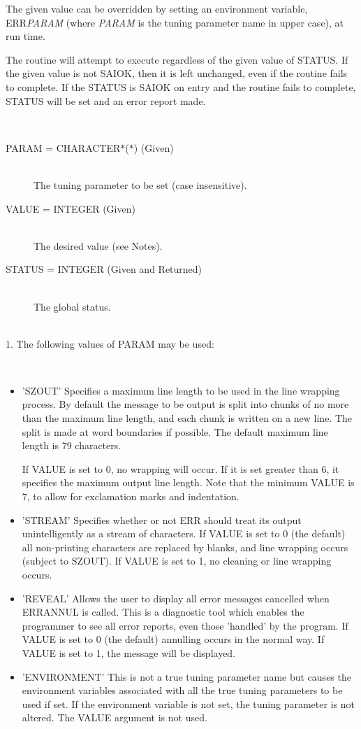 \documentclass[twoside,11pt]{article}
\renewcommand{\_}{\texttt{\symbol{95}}}
\newcommand{\sstinvocation}[1]{\item[Invocation:]\hspace{0.4em}{\tt #1}}
\newcommand{\sstarguments}[1]{
   \item[Arguments:] \mbox{} \\
   \vspace{-3.5ex}
   \begin{description}
      #1
   \end{description}
}
\newcommand{\sstsubsection}[1]{ \item[{#1}] \mbox{} \\}
\newcommand{\sstnotes}[1]{\item[Notes:] \mbox{} \\[1.3ex] #1}
\newcommand{\sstitemlist}[1]{
  \mbox{} \\
  \vspace{-3.5ex}
  \begin{itemize}
     #1
  \end{itemize}
}
\newcommand{\sstitem}{\item}
\newcommand{\sstinvocation}[1]{\item[Invocation:]
      \begin{description}
         {\ssttt #1}
      \end{description}
      \\
   }
\newcommand{\sstarguments}[1]{
      \item[Arguments:] \\
      \begin{description}
         #1
      \end{description}
      \\
   }
\newcommand{\sstsubsection}[1]{\item[{#1}]}
\newcommand{\sstnotes}[1]{\item[Notes:] #1 }
\newcommand{\sstitemlist}[1]{
      \begin{itemize}
         #1
      \end{itemize}
      \\
   }
\newcommand{\sstitem}{\item}
\begin{document}
\begin {small}
{{      The given value can be overridden by setting an environment variable,
      ERR\_\textit{PARAM} (where \textit{PARAM} is the tuning parameter name
      in upper case), at run time.

      The routine will attempt to execute regardless of the given value of
      STATUS. If the given value is not SAI\_\_OK, then it is left unchanged,
      even if the routine fails to complete. If the STATUS is SAI\_\_OK on
      entry and the routine fails to complete, STATUS will be set and an
      error report made.
   }
   \sstinvocation{
      CALL ERR\_TUNE( PARAM, VALUE, STATUS )
   }
   \sstarguments{
      \sstsubsection{
         PARAM = CHARACTER$*$($*$) (Given)
      }{
         The tuning parameter to be set (case insensitive).
      }
      \sstsubsection{
         VALUE = INTEGER (Given)
      }{
         The desired value (see Notes).
      }
      \sstsubsection{
         STATUS = INTEGER (Given and Returned)
      }{
         The global status.
      }
   }
   \sstnotes{
      1. The following values of PARAM may be used:
      \sstitemlist{
      \sstitem{'SZOUT' Specifies a maximum line length to be used in the line
           wrapping process. By default the message to be output is split into
           chunks of no more than the maximum line length, and each chunk is
           written on a new line. The split is made at word boundaries if 
           possible.
           The default maximum line length is 79 characters.

           If VALUE is set to 0, no wrapping will occur. If it is set greater
           than 6, it specifies the maximum output line length. Note that the
           minimum VALUE is 7, to allow for exclamation marks and indentation.
      }
      \sstitem{'STREAM' Specifies whether or not ERR should treat its output
           unintelligently as a stream of characters.
           If VALUE is set to 0 (the default) all non-printing characters are
           replaced by blanks, and line wrapping occurs (subject to SZOUT).
           If VALUE is set to 1, no cleaning or line wrapping occurs.
      }
      \sstitem{'REVEAL' Allows the user to display all error messages cancelled
           when ERR\_ANNUL is called. This is a diagnostic tool which enables
           the programmer to see all error reports, even those 'handled' 
           by the program. If VALUE is set to 0 (the default) annulling 
           occurs in the normal way. If VALUE is set to 1, the message 
           will be displayed.
      }
      \sstitem{'ENVIRONMENT' This is not a true tuning parameter name but causes
           the environment variables associated with all the true tuning 
           parameters to be used if set.  If the environment variable is
           not set, the tuning parameter is not altered. The VALUE argument
           is not used.
      }
      }

}}
\end{small}
\end{document}
